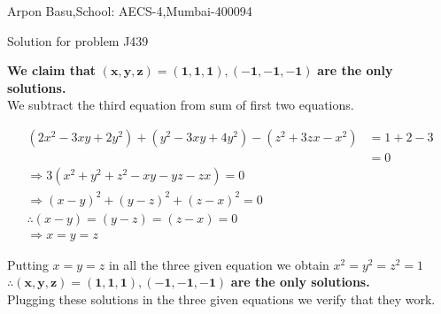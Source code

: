 \documentclass[a4paper,10pt]{article}
\begin{document}
\begin{center}


Arpon Basu,School: AECS-4,Mumbai-400094

Solution for problem J439
\end{center}
\textbf{We claim that} $\mathbf{ (x,y,z) = (1,1,1),(-1,-1,-1)}$ \textbf{are the only solutions.}\\


We subtract the third equation from sum of first two equations.


\begin{equation*}
\begin{split}
(2x^2-3xy+2y^2)+(y^2-3xy+4y^2)-(z^2+3zx-x^2)&=1+2-3 \\
                                            &=0 \\
\Rightarrow 3(x^2+y^2+z^2-xy-yz-zx)=0 \\
\Rightarrow (x-y)^2+(y-z)^2+(z-x)^2=0 \\
\therefore (x-y)=(y-z)=(z-x)=0 \\
\Rightarrow x=y=z
\end{split}
\end{equation*}

Putting $x=y=z$ in all the three given equation we obtain $x^2=y^2=z^2=1$\\
$\mathbf{\therefore (x,y,z) = (1,1,1),(-1,-1,-1)}$ \textbf{are the only solutions.} \\
Plugging these solutions in the three given equations we verify that they work.
\end{document}
